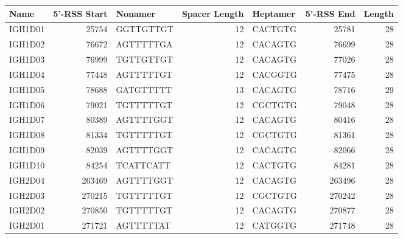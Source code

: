 \begin{tabular}{lrlrlrr}
  \toprule Name & 5'-RSS Start & Nonamer & Spacer Length & Heptamer & 5'-RSS End & Length \\ 
  \midrule IGH1D01 & 25754 & GGTTGTTGT & 12 & CACTGTG & 25781 & 28 \\ 
  IGH1D02 & 76672 & AGTTTTTGA & 12 & CACAGTG & 76699 & 28 \\ 
  IGH1D03 & 76999 & TGTTGTTGT & 12 & CACAGTG & 77026 & 28 \\ 
  IGH1D04 & 77448 & AGTTTTTGT & 12 & CACGGTG & 77475 & 28 \\ 
  IGH1D05 & 78688 & GATGTTTTT & 13 & CACAGTG & 78716 & 29 \\ 
  IGH1D06 & 79021 & TGTTTTTGT & 12 & CGCTGTG & 79048 & 28 \\ 
  IGH1D07 & 80389 & AGTTTTGGT & 12 & CACAGTG & 80416 & 28 \\ 
  IGH1D08 & 81334 & TGTTTTTGT & 12 & CGCTGTG & 81361 & 28 \\ 
  IGH1D09 & 82039 & AGTTTTGGT & 12 & CACAGTG & 82066 & 28 \\ 
  IGH1D10 & 84254 & TCATTCATT & 12 & CACTGTG & 84281 & 28 \\ 
  IGH2D04 & 263469 & AGTTTTGGT & 12 & CACAGTG & 263496 & 28 \\ 
  IGH2D03 & 270215 & TGTTTTTGT & 12 & CGCTGTG & 270242 & 28 \\ 
  IGH2D02 & 270850 & TGTTTTTGT & 12 & CACAGTG & 270877 & 28 \\ 
  IGH2D01 & 271721 & AGTTTTTAT & 12 & CATGGTG & 271748 & 28 \\ 
   \bottomrule \end{tabular}
